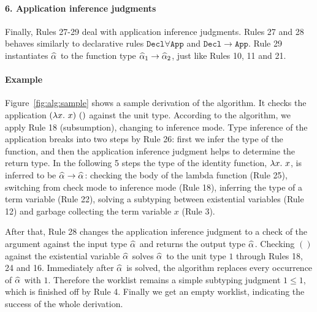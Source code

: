 \paragraph{\bf 6. Application inference judgments}
Finally, Rules 27-29 deal with application inference judgments.
Rules 27 and 28 behaves similarly to declarative rules $\mathtt{Decl\forall App}$ and $\mathtt{Decl\to App}$.
Rule 29 instantiates $\al$ to the function type $\al[1] \to \al[2]$, just like Rules 10, 11 and 21.

\paragraph{Example}
Figure~\ref{fig:alg:sample} shows a sample derivation of the algorithm.
It checks the application $(\lam x)~()$ against the unit type.
According to the algorithm, we apply Rule 18 (subsumption), changing to inference mode.
Type inference of the application breaks into two steps by Rule 26:
first we infer the type of the function,
and then the application inference judgment helps to determine the return type.
In the following 5 steps the type of the identity function, $\lam x$, is inferred to be $\al \to \al$:
checking the body of the lambda function (Rule 25),
switching from check mode to inference mode (Rule 18),
inferring the type of a term variable (Rule 22),
solving a subtyping between existential variables (Rule 12) and
garbage collecting the term variable $x$ (Rule 3).

After that, Rule 28 changes the application inference judgment to
a check of the argument against the input type $\al$ and returns the output type $\al$.
Checking $()$ against the existential variable $\al$ solves $\al$ to the unit type $1$
through Rules 18, 24 and 16.
Immediately after $\al$ is solved, the algorithm replaces every occurrence of $\al$ with $1$.
Therefore the worklist remains a simple subtyping judgment $1 \le 1$, which is finished off by Rule 4.
Finally we get an empty worklist, indicating the success of the whole derivation.

